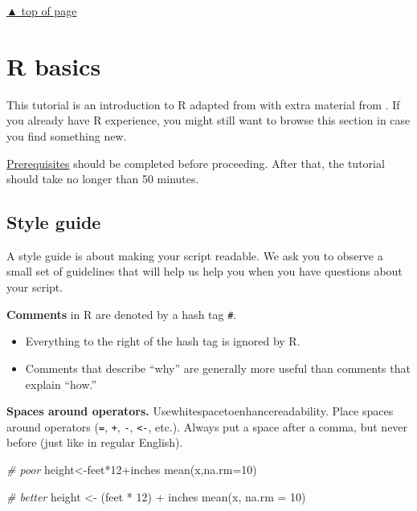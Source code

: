 \documentclass[
]{book}
\newenvironment{Shaded}{\begin{snugshade}}{\end{snugshade}}
\newcommand{\AttributeTok}[1]{\textcolor[rgb]{0.77,0.63,0.00}{#1}}
\newcommand{\CommentTok}[1]{\textcolor[rgb]{0.56,0.35,0.01}{\textit{#1}}}
\newcommand{\DecValTok}[1]{\textcolor[rgb]{0.00,0.00,0.81}{#1}}
\newcommand{\FunctionTok}[1]{\textcolor[rgb]{0.00,0.00,0.00}{#1}}
\newcommand{\NormalTok}[1]{#1}
\newcommand{\OtherTok}[1]{\textcolor[rgb]{0.56,0.35,0.01}{#1}}
\newcommand{\SpecialCharTok}[1]{\textcolor[rgb]{0.00,0.00,0.00}{#1}}
\providecommand{\tightlist}{%
  \setlength{\itemsep}{0pt}\setlength{\parskip}{0pt}}
\begin{document}
\protect\hyperlink{start-with-R}{▲ top of page}

\hypertarget{R-basics}{%
\chapter{R basics}\label{R-basics}}

This tutorial is an introduction to R adapted from \citep{Healy:2019:Ch.2} with extra material from \citep{Matloff:2019}. If you already have R experience, you might still want to browse this section in case you find something new.

\protect\hyperlink{prerequisites}{Prerequisites} should be completed before proceeding. After that, the tutorial should take no longer than 50 minutes.

\hypertarget{style-guide}{%
\section{Style guide}\label{style-guide}}

A style guide is about making your script readable. We ask you to observe a small set of guidelines that will help us help you when you have questions about your script.

\textbf{Comments} in R are denoted by a hash tag \texttt{\#}.

\begin{itemize}
\tightlist
\item
  Everything to the right of the hash tag is ignored by R.
\item
  Comments that describe ``why'' are generally more useful than comments that explain ``how.''
\end{itemize}

\textbf{Spaces around operators.} Usewhitespacetoenhancereadability. Place spaces around operators (\texttt{=}, \texttt{+}, \texttt{-}, \texttt{\textless{}-}, etc.). Always put a space after a comma, but never before (just like in regular English).

\begin{Shaded}
\begin{Highlighting}[]
\CommentTok{\# poor}
\NormalTok{height}\OtherTok{\textless{}{-}}\NormalTok{feet}\SpecialCharTok{*}\DecValTok{12}\SpecialCharTok{+}\NormalTok{inches}
\FunctionTok{mean}\NormalTok{(x,}\AttributeTok{na.rm=}\DecValTok{10}\NormalTok{)}

\CommentTok{\# better}
\NormalTok{height }\OtherTok{\textless{}{-}}\NormalTok{ (feet }\SpecialCharTok{*} \DecValTok{12}\NormalTok{) }\SpecialCharTok{+}\NormalTok{ inches}
\FunctionTok{mean}\NormalTok{(x, }\AttributeTok{na.rm =} \DecValTok{10}\NormalTok{)}
\end{Highlighting}
\end{Shaded}
\end{document}
